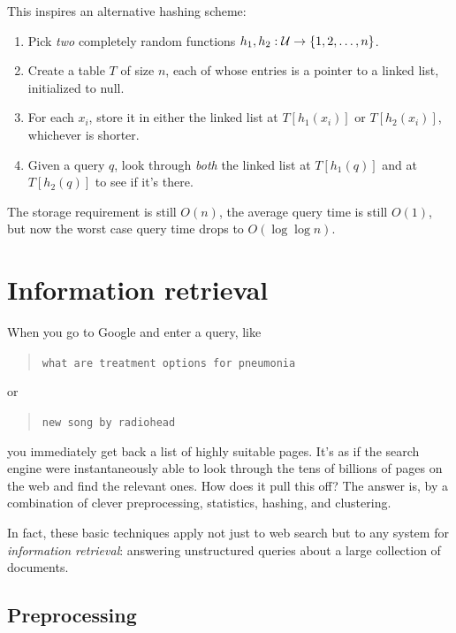 This inspires an alternative hashing scheme:

\begin{enumerate}
\item Pick {\it two} completely random functions $h_1, h_2: {\cal U} \rightarrow \{1,2,\ldots, n\}$. 

\item Create a table $T$ of size $n$, each of whose entries is a pointer to a 
linked list, initialized to null. 

\item For each $x_i$, store it in either the linked list at $T[h_1(x_i)]$ or $T[h_2(x_i)]$,
whichever is shorter.

\item Given a query $q$, look through {\it both} the linked list at $T[h_1(q)]$ and
at $T[h_2(q)]$ to see if it's there.
\end{enumerate}

The storage requirement is still $O(n)$, the average query time is still $O(1)$, but now
the worst case query time drops to $O(\log \log n)$.

\section{Information retrieval}

When you go to Google and enter a query, like
\begin{quote}
{\tt what are treatment options for pneumonia}
\end{quote}
or
\begin{quote}
{\tt new song by radiohead}
\end{quote}
you immediately get back a list of highly suitable pages. It's as if the search engine
were instantaneously able to look through the tens of billions of pages on the web and
find the relevant ones. How does it pull this off? The answer is, by a combination of
clever preprocessing, statistics, hashing, and clustering.

In fact, these basic techniques apply not just to web search but to any system for
{\it information retrieval}: answering unstructured queries about a large collection
of documents.

\subsection{Preprocessing}

